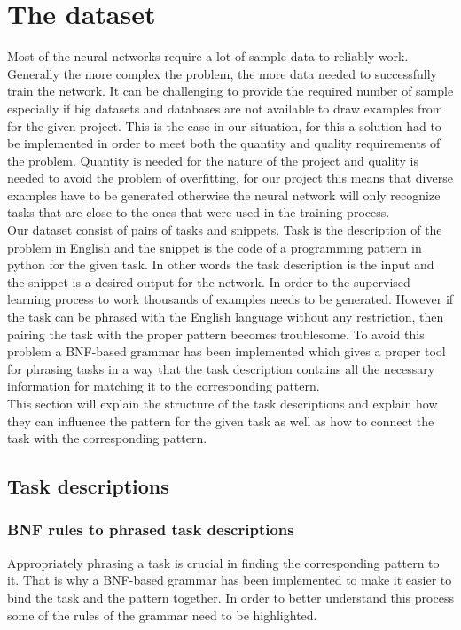 \documentclass[12pt]{article}
\begin{document}
 \section{The dataset}
   Most of the neural networks require a lot of sample data to reliably work. Generally the more complex the problem, the more data needed to successfully train the network. It can be challenging to provide the required number of sample especially if big datasets and databases are not available to draw examples from for the given project. This is the case in our situation, for this a solution had to be implemented in order to meet both the quantity and quality requirements of the problem. Quantity is needed for the nature of the project and quality is needed to avoid the problem of overfitting\cite{overfit1, overfit2}, for our project this means that diverse examples have to be generated otherwise the neural network will only recognize tasks that are close to the ones that were used in the training process.\\  
   Our dataset consist of pairs of tasks and snippets. Task is the description of the problem in English and the snippet is the code of a programming pattern in python for the given task. In other words the task description is the input and the snippet is a desired output for the network. In order to the supervised learning process\cite{super} to work thousands of examples needs to be generated. However if the task can be phrased with the English language without any restriction, then pairing the task with the proper pattern becomes troublesome. To avoid this problem a BNF-based\cite{BNF} grammar has been implemented which gives a proper tool for phrasing tasks in a way that the task description contains all the necessary information for matching it to the corresponding pattern.\\
   This section will explain the structure of the task descriptions and explain how they can influence the pattern for the given task as well as how to connect the task with the corresponding pattern.

    \subsection{Task descriptions}\label{sec:task}
    \subsubsection{BNF rules to phrased task descriptions }\label{sub:rules}
    Appropriately phrasing a task is crucial in finding the corresponding pattern to it. That is why a BNF-based grammar has been implemented to make it easier to bind the task and the pattern together. In order to better understand this process some of the rules of the grammar need to be highlighted.
    
\end{document}
